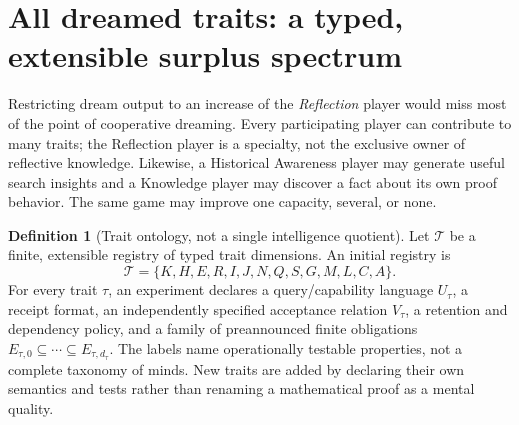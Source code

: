 \documentclass[11pt,letterpaper]{article}
\theoremstyle{definition}
\newtheorem{definition}{Definition}[section]
\theoremstyle{plain}
\theoremstyle{definition}
\begin{document}
\section{All dreamed traits: a typed, extensible surplus spectrum}\label{gl-first-W0-s6}
\label{sec:spectrum}
Restricting dream output to an increase of the \emph{Reflection} player would miss most of the point of cooperative dreaming. Every participating player can contribute to many traits; the Reflection player is a specialty, not the exclusive owner of reflective knowledge. Likewise, a Historical Awareness player may generate useful search insights and a Knowledge player may discover a fact about its own proof behavior. The same game may improve one capacity, several, or none.

\begin{definition}[Trait ontology, not a single intelligence quotient]
Let $\mathcal T$ be a finite, extensible registry of typed trait dimensions. An initial registry is
\[
\mathcal T=\{K,H,E,R,I,J,N,Q,S,G,M,L,C,A\}.
\]
For every trait $\tau$, an experiment declares a query/capability language $U_\tau$, a receipt format, an independently specified acceptance relation $V_\tau$, a retention and dependency policy, and a family of preannounced finite obligations $E_{\tau,0}\subseteq\cdots\subseteq E_{\tau,d_\tau}$. The labels name operationally testable properties, not a complete taxonomy of minds. New traits are added by declaring their own semantics and tests rather than renaming a mathematical proof as a mental quality.
\end{definition}
\end{document}
